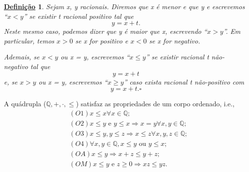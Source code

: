 \documentclass{article}
\newtheorem*{def*}{\underline{Defini\c c\~ao}}
\begin{document}
\begin{def*}
  Sejam x, y racionais. Diremos que x \'e menor e que y e escrevemos ``$x < y$'' se existir t racional positivo tal que 
  $$
    y = x + t.
  $$
  Neste mesmo caso, podemos dizer que y \'e maior que x, escrevendo ``$x > y$''. Em particular, temos $x > 0$ se x for positivo e 
$x < 0$ se x for negativo. 

  Ademais, se $x < y$ ou x = y, escrevemos ``$x \leq{y}$'' se existir racional t n\~ao-negativo tal que 
  $$
    y = x + t
  $$
  e, se $x > y$ ou x = y, escrevemos ``$x \geq{y}$'' caso exista racional t n\~ao-positivo com
  $$
    y = x + t. \square
  $$
\end{def*}
  A qu\'adrupla ($\mathbb{Q}, +, \cdot, \leq{}$) satisfaz as propriedades de um corpo ordenado, i.e., 
 \begin{align*}
   &(O1) x \leq{x}\forall x\in \mathbb{Q};\\
   &(O2) x\leq{y} \text{ e } y \leq{x}\Rightarrow x = y \forall x, y\in \mathbb{Q};\\
   &(O3) x \leq{y}, y \leq{z}\Rightarrow x \leq{z}\forall x, y, z\in \mathbb{Q};\\
   &(O4)\forall x, y \in \mathbb{Q}, x \leq{y} \text{ ou } y \leq{x};\\
   &(OA) x \leq{y}\Rightarrow x + z \leq{y + z};\\
   &(OM) x \leq{y} \text{ e } z \geq{0}\Rightarrow xz \leq{yz}. 
 \end{align*}
\end{document}
